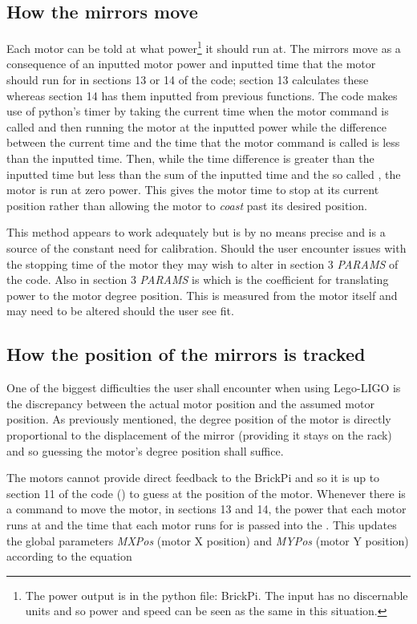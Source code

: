 \documentclass[a4paper, 12pt]{book}
\begin{document}
\subsection{How the mirrors move}
Each motor can be told at what power\footnote{\label{power meaning}The power output is in the python file: BrickPi. The input has no discernable units and so power and speed can be seen as the same in this situation.} it should run at. The mirrors move as a consequence of an inputted motor power and inputted time that the motor should run for in sections 13 or 14 of the code; section 13 calculates these whereas section 14 has them inputted from previous functions. The code makes use of python's timer by taking the current time when the motor command is called and then running the motor at the inputted power while the difference between the current time and the time that the motor command is called is less than the inputted time. Then, while the time difference is greater than the inputted time but less than the sum of the inputted time and the so called , the motor is run at zero power. This gives the motor time to stop at its current position rather than allowing the motor to \textit{coast} past its desired position.

This method appears to work adequately but is by no means precise and is a source of the constant need for calibration. Should the user encounter issues with the stopping time of the motor they may wish to alter  in section 3 \textit{PARAMS} of the code. Also in section 3 \textit{PARAMS} is  which is the coefficient for translating power to the motor degree position. This is measured from the motor itself and may need to be altered should the user see fit.


\subsection{How the position of the mirrors is tracked}
One of the biggest difficulties the user shall encounter when using Lego-LIGO is the discrepancy between the actual motor position and the assumed motor position. As previously mentioned, the degree position of the motor is directly proportional to the displacement of the mirror (providing it stays on the rack) and so guessing the motor's degree position shall suffice.

The motors cannot provide direct feedback to the BrickPi and so it is up to section 11 of the code () to guess at the position of the motor. Whenever there is a command to move the motor, in sections 13 and 14, the power that each motor runs at and the time that each motor runs for is passed into the . This updates the global parameters \textit{MXPos} (motor X position) and \textit{MYPos} (motor Y position) according to the equation
\end{document}
